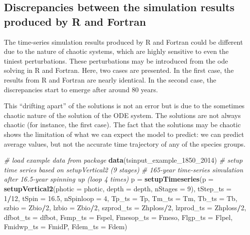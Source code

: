 \documentclass[
]{article}
\newenvironment{Shaded}{\begin{snugshade}}{\end{snugshade}}
\newcommand{\AttributeTok}[1]{\textcolor[rgb]{0.13,0.29,0.53}{#1}}
\newcommand{\CommentTok}[1]{\textcolor[rgb]{0.56,0.35,0.01}{\textit{#1}}}
\newcommand{\DecValTok}[1]{\textcolor[rgb]{0.00,0.00,0.81}{#1}}
\newcommand{\FloatTok}[1]{\textcolor[rgb]{0.00,0.00,0.81}{#1}}
\newcommand{\FunctionTok}[1]{\textcolor[rgb]{0.13,0.29,0.53}{\textbf{#1}}}
\newcommand{\NormalTok}[1]{#1}
\newcommand{\OtherTok}[1]{\textcolor[rgb]{0.56,0.35,0.01}{#1}}
\newcommand{\SpecialCharTok}[1]{\textcolor[rgb]{0.81,0.36,0.00}{\textbf{#1}}}
\begin{document}
\subsection{Discrepancies between the simulation results produced by R
and
Fortran}\label{discrepancies-between-the-simulation-results-produced-by-r-and-fortran}

The time-series simulation results produced by R and Fortran could be
different due to the nature of chaotic systems, which are highly
sensitive to even the tiniest perturbations. These perturbations may be
introduced from the ode solving in R and Fortran. Here, two cases are
presented. In the first case, the results from R and Fortran are nearly
identical. In the second case, the discrepancies start to emerge after
around 80 years.

This ``drifting apart'' of the solutions is not an error but is due to
the sometimes chaotic nature of the solution of the ODE system. The
solutions are not always chaotic (for instance, the first case). The
fact that the solutions may be chaotic shows the limitation of what we
can expect the model to predict: we can predict average values, but not
the accurate time trajectory of any of the species groups.

\begin{Shaded}
\begin{Highlighting}[]
\CommentTok{\# load example data from package }
\FunctionTok{data}\NormalTok{(tsinput\_example\_1850\_2014)}
\CommentTok{\# setup time series based on setupVertical2 (9 stages)}
\CommentTok{\# 165{-}year time{-}series simulation after 16.5{-}year spinning up (loop 4 times)}
\NormalTok{p }\OtherTok{=} \FunctionTok{setupTimeseries}\NormalTok{(}\AttributeTok{p =} \FunctionTok{setupVertical2}\NormalTok{(}\AttributeTok{photic =}\NormalTok{ photic, }\AttributeTok{depth =}\NormalTok{ depth, }\AttributeTok{nStages =} \DecValTok{9}\NormalTok{),}
                  \AttributeTok{tStep\_ts =} \DecValTok{1}\SpecialCharTok{/}\DecValTok{12}\NormalTok{,}
                  \AttributeTok{tSpin =} \FloatTok{16.5}\NormalTok{, }
                  \AttributeTok{nSpinloop =} \DecValTok{4}\NormalTok{,}
                  \AttributeTok{Tp\_ts =}\NormalTok{ Tp,}
                  \AttributeTok{Tm\_ts =}\NormalTok{ Tm,}
                  \AttributeTok{Tb\_ts =}\NormalTok{ Tb,}
                  \AttributeTok{szbio =}\NormalTok{ Zbio}\SpecialCharTok{/}\DecValTok{2}\NormalTok{,}
                  \AttributeTok{lzbio =}\NormalTok{ Zbio}\SpecialCharTok{/}\DecValTok{2}\NormalTok{,}
                  \AttributeTok{szprod\_ts =}\NormalTok{ Zhploss}\SpecialCharTok{/}\DecValTok{2}\NormalTok{,}
                  \AttributeTok{lzprod\_ts =}\NormalTok{ Zhploss}\SpecialCharTok{/}\DecValTok{2}\NormalTok{,}
                  \AttributeTok{dfbot\_ts  =}\NormalTok{ dfbot,}
                  \AttributeTok{Fsmp\_ts   =}\NormalTok{ Fspel,}
                  \AttributeTok{Fmesop\_ts =}\NormalTok{ Fmeso,}
                  \AttributeTok{Flgp\_ts   =}\NormalTok{ Flpel,}
                  \AttributeTok{Fmidwp\_ts =}\NormalTok{ FmidP,}
                  \AttributeTok{Fdem\_ts   =}\NormalTok{ Fdem)}
\end{Highlighting}
\end{Shaded}
\end{document}
